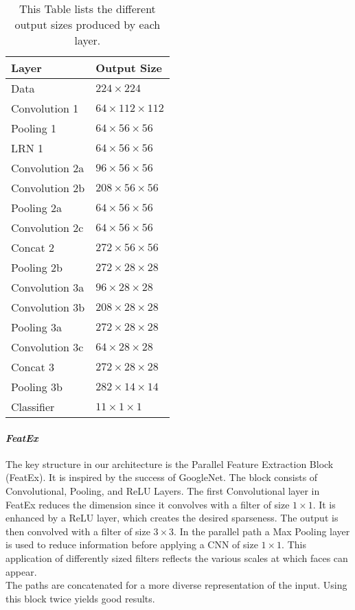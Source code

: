 \documentclass[10pt,journal,compsoc, hidelinks]{IEEEtran}
\newcommand{\paraV}{\vspace{1em}}
\begin{document}
\begin{table}[ht!]
\centering
\caption{This Table lists the different output sizes produced by each layer.}
\label{tab:layers}

\begin{tabular}{l|l}
\hline
Layer & Output Size \\
\hline
Data & $224 \times 224$\\
Convolution 1 & $64 \times 112 \times 112$\\
Pooling 1 & $64 \times 56 \times 56$ \\
LRN 1 & $64 \times 56 \times 56$\\
\hline

Convolution 2a & $96 \times 56 \times 56$\\
Convolution 2b & $208 \times 56 \times 56$\\
Pooling 2a & $64 \times 56 \times 56$\\
Convolution 2c & $64 \times 56 \times 56$\\
Concat 2 & $272 \times 56 \times 56$\\
Pooling 2b & $272 \times 28 \times 28$\\
\hline

Convolution 3a & $96 \times 28 \times 28$\\
Convolution 3b & $208 \times 28 \times 28$\\
Pooling 3a & $272 \times 28 \times 28$\\
Convolution 3c & $64 \times 28 \times 28$\\
Concat 3 & $272 \times 28 \times 28$\\
Pooling 3b & $282 \times 14 \times 14$\\
\hline

Classifier & $11 \times 1 \times 1$\\
\hline
\end{tabular}
\end{table}

\paraV
\paragraph{\textit{FeatEx}}
The key structure in our architecture is the Parallel Feature Extraction Block (FeatEx). It is inspired by the success of GoogleNet. The block consists of Convolutional, Pooling, and ReLU Layers. The first Convolutional layer in FeatEx reduces the dimension since it convolves with a filter of size $1\times1$. It is enhanced by a ReLU layer, which creates the desired sparseness. The output is then convolved with a filter of size $3\times3$. In the parallel path a Max Pooling layer is used to reduce information before applying a CNN of size $1\times1$. This application of differently sized filters reflects the various scales at which faces can appear.\\
The paths are concatenated for a more diverse representation of the input. Using this block twice yields good results.\\
\end{document}
